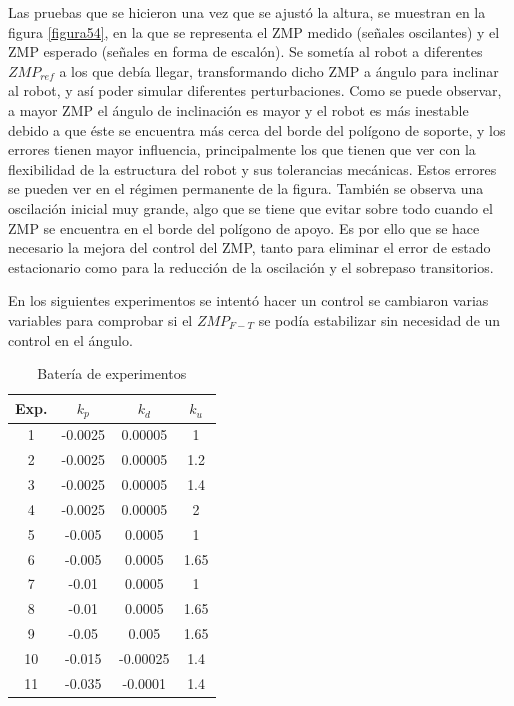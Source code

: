 Las pruebas que se hicieron una vez que se ajustó la altura, se muestran en la figura  \ref{figura54}, en la que se representa el ZMP medido (señales oscilantes) y el ZMP esperado (señales en forma de escalón). Se sometía al robot a diferentes $ZMP_{ref}$ a los que debía llegar, transformando dicho ZMP a ángulo para inclinar al robot, y así poder simular diferentes perturbaciones. Como se puede observar, a mayor ZMP el ángulo de inclinación es mayor y el robot es más inestable debido a que éste se encuentra más cerca del borde del polígono de soporte, y los errores tienen mayor influencia, principalmente los que tienen que ver con la flexibilidad de la estructura del robot y sus tolerancias mecánicas. Estos errores se pueden ver en el régimen permanente de la figura. También se observa una oscilación inicial muy grande, algo que se tiene que evitar sobre todo cuando el ZMP se encuentra en el borde del polígono de apoyo. Es por ello que se hace necesario la mejora del control del ZMP, tanto para eliminar el error de estado estacionario como para la reducción de la oscilación y el sobrepaso transitorios.







En los siguientes experimentos se intentó hacer un control se cambiaron varias variables para comprobar si el $ZMP_{F-T}$ se podía estabilizar sin necesidad de un control en el ángulo.

\begin{table}[H]
\begin{center}
\begin{tabular}{|c|c|c|c|}
\hline
Exp. & $k_p$   & $k_d$    & $k_u$ \\ \hline
1    & -0.0025 & 0.00005  & 1    \\ \hline
2    & -0.0025 & 0.00005  & 1.2  \\ \hline
3    & -0.0025 & 0.00005  & 1.4  \\ \hline
4    & -0.0025 & 0.00005  & 2    \\ \hline
5    & -0.005  & 0.0005   & 1    \\ \hline
6    & -0.005  & 0.0005   & 1.65 \\ \hline
7    & -0.01   & 0.0005   & 1    \\ \hline
8    & -0.01   & 0.0005   & 1.65 \\ \hline
9    & -0.05   & 0.005    & 1.65 \\ \hline
10   & -0.015  & -0.00025 & 1.4  \\ \hline
11   & -0.035  & -0.0001  & 1.4  \\ \hline
\end{tabular}
\end{center}
\caption{Batería de experimentos}
\label{tabla51}
\end{table}

